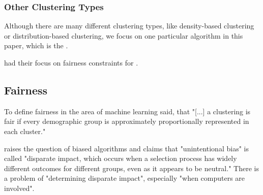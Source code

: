 \subsubsection{Other Clustering Types}

Although there are many different clustering types, like density-based clustering or distribution-based clustering, we focus on one particular algorithm in this paper, which is the .

\textcite[]{Kleindessner2019} had their focus on fairness constraints for .


\subsection{Fairness}

To define fairness in the area of machine learning \textcite[1]{Kleindessner2019} said, that "[...] a clustering is fair if every demographic group is approximately proportionally represented in each cluster."

\textcite[1]{Feldman2014CertifyingImpact} raises the question of biased algorithms and claims that "unintentional bias" is called "disparate impact, which occurs when a selection process has widely different outcomes for different groups, even as it appears to be neutral." There is a problem of "determining disparate impact", especially "when computers are involved".

